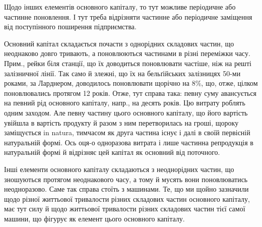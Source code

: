 Щодо інших елементів основного капіталу, то тут можливе періодичне або частинне поновлення. І тут
треба відрізняти частинне або періодичне заміщення від поступінного поширення підприємства.

Основний капітал складається почасти з однорідних складових частин, що неоднаково довго тривають, а
поновлюються частинами в різні переміжки часу. Прим., рейки біля станції, що їх доводиться
поновлювати частіше, ніж на решті залізничної лінії. Так само й злежні, що їх на бельґійських
залізницях 50-ми роками, за Ларднером, доводилось поновлювати щорічно на 8\%, що, отже, цілком
поновлювались протягом 12 років.
Отже, тут справа така: певну суму авансується на певний рід основного капіталу, напр., на
десять років. Цю витрату роблять одним заходом. Але певну частину цього основного капіталу, що його
вартість увійшла в вартість продукту й разом з ним перетворилась на гроші, щороку заміщується in
natura, тимчасом як друга частина існує і далі в своїй первісній натуральній формі. Ось оця-о
одноразова витрата і лише
частинна репродукція в натуральній формі й відрізняє цей капітал як основний від поточного.

Інші елементи основного капіталу складаються з неоднорідних частин, що зношуються протягом
неоднакового часу, а тому й мусять вони поновлюватись неодноразово. Саме так справа стоїть з
машинами. Те, що ми щойно зазначили щодо різної життьової тривалости різних складових частин
основного капіталу, має тут силу й щодо життьової тривалости різних складових частин тієї самої
машини, що фігурує як елемент цього
основного капіталу.

